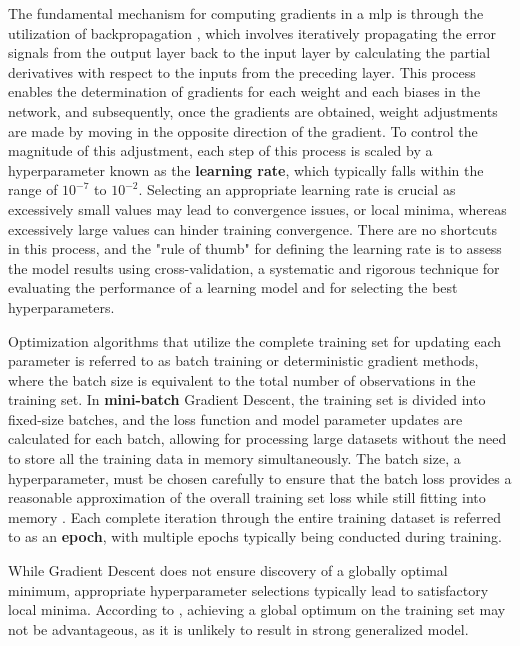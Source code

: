 The fundamental mechanism for computing gradients in a \gls{mlp} is through the utilization of backpropagation \cite{Rumelhart1986}, which involves iteratively propagating the error signals from the output layer back to the input layer by calculating the partial derivatives with respect to the inputs from the preceding layer. This process enables the determination of gradients for each weight and each biases in the network, and subsequently, once the gradients are obtained, weight adjustments are made by moving in the opposite direction of the gradient. To control the magnitude of this adjustment, each step of this process is scaled by a hyperparameter known as the \textbf{learning rate}, which typically falls within the range of $10^{-7}$ to $10^{-2}$. Selecting an appropriate learning rate is crucial as excessively small values may lead to convergence issues, or local minima, whereas excessively large values can hinder training convergence. There are no shortcuts in this process, and the "rule of thumb" for defining the learning rate is to assess the model results using cross-validation, a systematic and rigorous technique for evaluating the performance of a learning model and for selecting the best hyperparameters.

Optimization algorithms that utilize the complete training set for updating each parameter is referred to as batch training or deterministic gradient methods, where the batch size is equivalent to the total number of observations in the training set. In \textbf{mini-batch} Gradient Descent, the training set is divided into fixed-size batches, and the loss function and model parameter updates are calculated for each batch, allowing for processing large datasets without the need to store all the training data in memory simultaneously. The batch size, a hyperparameter, must be chosen carefully to ensure that the batch loss provides a reasonable approximation of the overall training set loss while still fitting into memory \cite{Bishop2023}. Each complete iteration through the entire training dataset is referred to as an \textbf{epoch}, with multiple epochs typically being conducted during training. 

While Gradient Descent does not ensure discovery of a globally optimal minimum, appropriate hyperparameter selections typically lead to satisfactory local minima. According to \textcite{Choromanska2015}, achieving a global optimum on the training set may not be advantageous, as it is unlikely to result in strong generalized model.


